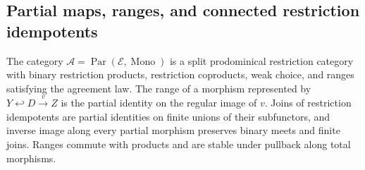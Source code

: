 \subsection{Partial maps, ranges, and connected restriction idempotents}

\begin{proposition}\label{prop:fork-structure}
The category $\mathcal A=\operatorname{Par}(\mathcal E,
\operatorname{Mono})$ is a split prodominical restriction category
with binary restriction products, restriction coproducts, weak
choice, and ranges satisfying the agreement law. The range of a morphism
represented by $Y\hookleftarrow D\xrightarrow{v}Z$ is the partial
identity on the regular image of $v$.
Joins of restriction idempotents are partial identities on finite
unions of their subfunctors, and inverse image along every partial
morphism preserves binary meets and finite joins. Ranges commute with products and
are stable under pullback along total morphisms.
\end{proposition}
